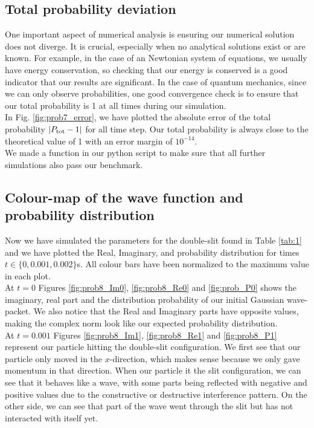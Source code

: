 \documentclass[english,notitlepage,reprint,nofootinbib]{revtex4-2}  %
\begin{document}
\subsection{Total probability deviation} \label{subsec:tot_prob_dev}

	One important aspect of numerical analysis is ensuring our numerical
	solution does not diverge. It is crucial, especially when no
	analytical solutions exist or are known. For example, in the case of an
	Newtonian system of equations, we usually have energy conservation,
	so checking that our energy is conserved is a good indicator that our
	results are significant. In the case of quantum mechanics, since we
	can only observe probabilities, one good convergence check is to ensure
	that our total probability is 1 at all times during our simulation. \\

	In Fig.	\ref{fig:prob7_error}, we have plotted the absolute error of
	the total probability $|P_{\rm tot} - 1|$ for all time step.
	Our total probability is always close to the theoretical
	value of 1 with an error margin of $10^{-14}$.  \\

	We made a function in our python script to make sure that all further
	simulations also pass our benchmark.

	\subsection{Colour-map of the wave function and probability distribution}\label{subsec:colormap}

	Now we have simulated the parameters for the double-slit found in
	Table \ref{tab:1} and we have plotted the Real, Imaginary, and probability
	distribution for times $t \in \{0, 0.001, 0.002 \}$s. All colour bars have been normalized to the maximum value in each plot. \\

	At $t=0$ Figures \ref{fig:prob8_Im0}, \ref{fig:prob8_Re0} and \ref{fig:prob_P0} shows the imaginary, real part and the distribution probability
	of our initial Gaussian wave-packet. We also notice that the Real and Imaginary
	parts have opposite values, making the complex norm look like our expected probability distribution. \\

	At $t=0.001$ Figures \ref{fig:prob8_Im1}, \ref{fig:prob8_Re1} and \ref{fig:prob8_P1}
	represent our particle hitting the double-slit configuration. We first see that our
	particle only moved in the $x$-direction, which makes sense because we only gave momentum in that direction. When our particle it the slit configuration, we can see
	that it behaves like a wave, with some parts being reflected with negative and positive values due to the constructive or destructive interference pattern. On the other side, we can see that part of the wave went through the slit but has not interacted with itself yet. \\
\end{document}
